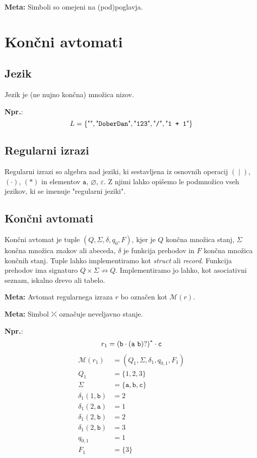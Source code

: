 \documentclass{report}
\newcommand{\Ex}{\textbf{Npr.}:\ }
\newcommand{\Special}[1]{\textbf{#1}}
\newcommand{\Empty}{\varnothing}
\newcommand{\Null}{\varepsilon}
\newcommand{\Alphabet}{\Sigma}
\newcommand{\Automaton}[1]{\mathcal{M}(#1)}
\newcommand{\Str}[1]{\text{\textquotedbl\texttt{#1}\textquotedbl}}
\newcommand{\Char}[1]{\texttt{#1}}
\newcommand{\Seq}{\cdot}
\newcommand{\Spc}{\ }
\newcommand{\Union}{\mathrel{|}}
\newcommand{\Kleene}[1]{{#1}^\ast}
\newcommand{\Err}{\rdiagovfdiag}
\begin{document}
\Special{Meta:} Simboli so omejeni na (pod)poglavja.

\chapter{Končni avtomati}

\section{Jezik}
Jezik je (ne nujno končna) množica nizov.

\Ex
\begin{equation*}
  L = \{\Str{}, \Str{DoberDan}, \Str{123}, \Str{/}, \Str{1 + 1} \}
\end{equation*}

\section{Regularni izrazi}
Regularni izrazi so algebra nad jeziki, ki sestavljena iz osnovnih operacij $(\Union)$, $(\Seq)$, $(\ast)$ in elementov $\Char{a}$, $\Empty$, $\Null$.
Z njimi lahko opišemo le podmnožico vseh jezikov, ki se imenuje "regularni jeziki".

\section{Končni avtomati}

Končni avtomat je tuple $(Q, \Alphabet, \delta, q_0, F)$, kjer je $Q$ končna množica stanj, $\Sigma$ končna množica znakov ali abeceda, $\delta$ je funkcija prehodov in $F$ končna množica končnih stanj.
Tuple lahko implementiramo kot \emph{struct} ali \emph{record}.
Funkcija prehodov ima signaturo $Q \times \Sigma \not\rightarrow Q$.
Implementiramo jo lahko, kot asociativni seznam, iskalno drevo ali tabelo.

\Special{Meta:} Avtomat regularnega izraza $r$ bo označen kot $\Automaton{r}$.

\Special{Meta:} Simbol $\Err$ označuje neveljavno stanje.

\Ex
\begin{equation}
  r_1 = \Kleene{(\Char{b} \Seq (\Char{a} \Spc \Char{b})?)} \Seq \Char{c} \\
\end{equation}
\begin{align*}
  \Automaton{r_1} &= (Q_1, \Sigma, \delta_1, q_{0, 1}, F_1)\\[1em]
  Q_1 &= \{1, 2, 3\} \\[1em]
  \Sigma &= \{\Char{a}, \Char{b}, \Char{c}\} \\[1em]
  \delta_1(1, \Char{b}) & =  2\\
  \delta_1(2, \Char{a}) & =  1\\
  \delta_1(2, \Char{b}) & =  2\\
  \delta_1(2, \Char{b}) & =  3\\[1em]
  q_{0, 1} &= 1 \\[1em]
  F_1 &= \{3\}
\end{align*}
\end{document}
